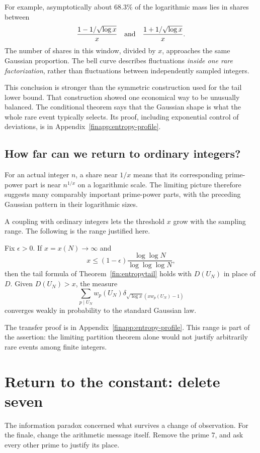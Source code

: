 For example, asymptotically about $68.3\%$ of the logarithmic mass
lies in shares between
\[
 \frac{1-1/\sqrt{\log x}}x
 \quad\hbox{and}\quad
 \frac{1+1/\sqrt{\log x}}x.
\]
The number of shares in this window, divided by $x$, approaches the
same Gaussian proportion.
The bell curve describes fluctuations \emph{inside one rare
factorization}, rather than fluctuations between independently
sampled integers.

This conclusion is stronger than the symmetric construction used for
the tail lower bound.  That construction showed one economical way
to be unusually balanced.  The conditional theorem says that the
Gaussian shape is what the whole rare event typically selects.
Its proof, including exponential control of deviations, is in
Appendix~\ref{finapp:entropy-profile}.

\subsection{How far can we return to ordinary integers?}
For an actual integer $n$, a share near $1/x$ means that its corresponding
prime-power part is near $n^{1/x}$ on a logarithmic scale.
The limiting picture therefore suggests many comparably important
prime-power parts, with the preceding Gaussian pattern in their
logarithmic sizes.

A coupling with ordinary integers lets the threshold $x$ grow with
the sampling range.  The following is the range justified here.
\begin{corollary}\label{fin:integerentropy}
Fix $\epsilon>0$.  If $x=x(N)\to\infty$ and
\[
 x\le(1-\epsilon)\frac{\log\log N}{\log\log\log N},
\]
then the tail formula of Theorem~\ref{fin:entropytail} holds with
$D(U_N)$ in place of $D$.  Given $D(U_N)>x$, the measure
\[
 \sum_{p\mid U_N}w_p(U_N)
       \delta_{\sqrt{\log x}(xw_p(U_N)-1)}
\]
converges weakly in probability to the standard Gaussian law.
\end{corollary}
The transfer proof is in Appendix~\ref{finapp:entropy-profile}.
This range is part of the assertion: the limiting partition theorem
alone would not justify arbitrarily rare events among finite integers.

\section{Return to the constant: delete seven}\label{fin:deletion}
The information paradox concerned what survives a change of observation.
For the finale, change the arithmetic message itself.
Remove the prime $7$, and ask every other prime to justify its place.

